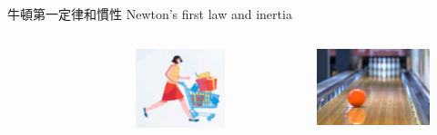 \documentclass[beamer=true]{standalone}
\begin{document}
\begin{frame}{牛頓第一定律和慣性 Newton's first law and inertia}
\begin{columns}
\begin{figure}[h!]
        \end{figure}
        \begin{figure}[h!]
            \centering
            \includegraphics[width=.85\textwidth]{assets/b65bc2e1.png}
        \end{figure}
        \begin{figure}[h!]
            \centering
            \includegraphics[width=.85\textwidth]{assets/888883a6.png}
        \end{figure}
    \end{columns}

\end{frame}
\end{document}
